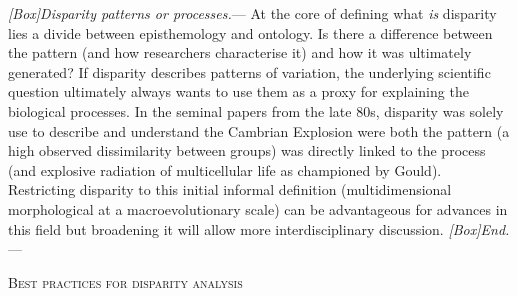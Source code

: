 \documentclass[12pt,letterpaper]{article}
\renewcommand{\section}[1]{%
\bigskip
\begin{center}
\begin{Large}
\normalfont\scshape #1
\medskip
\end{Large}
\end{center}}
\renewcommand{\subsubsection}[1]{%
\vspace{2ex}
\noindent
\textit{#1.}---}
\begin{document}
\subsubsection{[Box]Disparity patterns or processes}
At the core of defining what \textit{is} disparity lies a divide between episthemology and ontology.
Is there a difference between the pattern (and how researchers characterise it) and how it was ultimately generated?
If disparity describes patterns of variation, the underlying scientific question ultimately always wants to use them as a proxy for explaining the biological processes.
In the seminal papers from the late 80s, disparity was solely use to describe and understand the Cambrian Explosion were both the pattern (a high observed dissimilarity between groups) was directly linked to the process (and explosive radiation of multicellular life as championed by Gould).
Restricting disparity to this initial informal definition (multidimensional morphological at a macroevolutionary scale) can be advantageous for advances in this field but broadening it will allow more interdisciplinary discussion.
\subsubsection{[Box]End}



\section{Best practices for disparity analysis}
\end{document}
